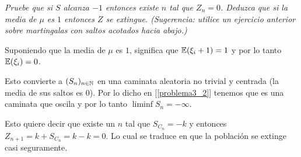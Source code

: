 \emph{
    Pruebe que si $S$ alcanza $-1$ entonces existe $n$ tal que $Z_n=0$. 
    Deduzca que si la media de $\mu$ es $1$ entonces $Z$ se extingue. 
    (Sugerencia: utilice un ejercicio anterior sobre martingalas con saltos acotados hacia abajo.) 
}

\afterstatement\pn

Suponiendo que la media de $\mu$ es $1$, significa que $\mathbb{E}(\xi_i + 1) = 1$ y por lo tanto $\mathbb{E}(\xi_i) = 0$.\pn

Esto convierte a $(S_n)_{n \in \mathbb{N}}$ en una caminata aleatoria no trivial y centrada (la media de sus saltos es 0).
Por lo dicho en [\ref{problema3_2}] tenemos que es una caminata que oscila y por lo tanto $\liminf S_n = -\infty$.\pn

Esto quiere decir que existe un $n$ tal que $S_{C_{n}} = -k$ y entonces 
$Z_{n + 1} = k + S_{C_{n}} = k - k = 0$. Lo cual se traduce en que la población se extinge casi seguramente.\pn